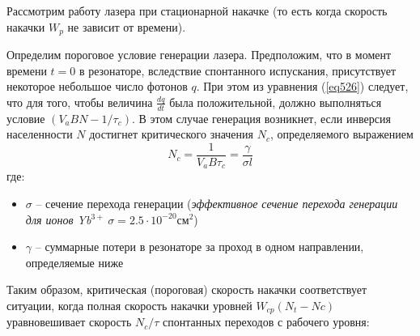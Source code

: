 \documentclass[a4paper, 12pt]{article}
\begin{document}
	Рассмотрим работу лазера при стационарной накачке (то есть когда скорость накачки $W_p$ не зависит от времени).\par
	Определим пороговое условие генерации лазера.  Предположим, что в момент времени $t=0$ в резонаторе, вследствие спонтанного испускания, присутствует некоторое небольшое число фотонов $q$. При этом из уравнения (\ref{eq526}) следует, что для того, чтобы величина $\frac{dq}{dt}$ была положительной, должно выполняться условие $\left(V_aBN-1/\tau_c\right)$. В этом случае генерация возникнет, если инверсия населенности $N$ достигнет критического значения $N_c$, определяемого выражением
	\begin{equation}
		N_c=\frac{1}{V_aB\tau_c}=\frac{\gamma}{\sigma l}
	\end{equation}
	где:
	\begin{itemize}
		\item $\sigma$ -- сечение перехода генерации (\textit{эффективное сечение перехода генерации для ионов Yb$^{3+}\ \sigma=2.5\cdot10^{-20}\text{см}^2$})
		\item $\gamma$ -- суммарные потери в резонаторе за проход в одном направлении, определяемые ниже
	\end{itemize}
	\par
	Таким образом, критическая (пороговая) скорость накачки соответствует ситуации, когда полная скорость накачки уровней $W_{cp}\left(N_t-Nc\right)$ уравновешивает скорость $N_c/\tau$ спонтанных переходов с рабочего уровня:
	
\end{document}
